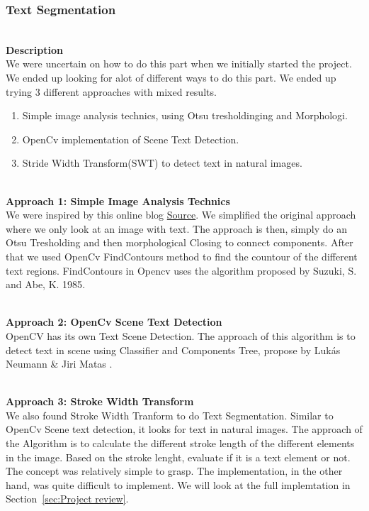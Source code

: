\documentclass[11pt,a4paper,UKenglish]{article}
\begin{document}
\subsubsection{Text Segmentation}
\noindent \\ \textbf{Description}
\noindent \\ We were uncertain on how to do this part when we initially started
the project. We ended up looking for alot of different ways to do this part.
We ended up trying 3 different approaches with mixed results.
\begin{enumerate}
  \item Simple image analysis technics, using Otsu tresholdinging and Morphologi.
  \item OpenCv implementation of Scene Text Detection.
  \item Stride Width Transform(SWT) to detect text in natural images.
\end{enumerate}

\noindent \\ \textbf{Approach 1: Simple Image Analysis Technics}
\noindent \\ We were inspired by this online blog \href{https://www.danvk.org/2015/01/07/finding-blocks-of-text-in-an-image-using-python-opencv-and-numpy.html}{Source}\cite{_finding_????}.
We simplified the original approach where we only look at an image with text.
The approach is then, simply do an Otsu Tresholding and then morphological
Closing to connect components. After that we used OpenCv FindContours method to
find the countour of the different text regions. FindContours in Opencv uses
the algorithm proposed by Suzuki, S. and Abe, K. 1985\cite{suzuki_topological_????}.

\noindent \\ \textbf{Approach 2: OpenCv Scene Text Detection}
\noindent \\ OpenCV has its own Text Scene Detection. The approach of this
algorithm is to detect text in scene using Classifier and Components Tree,
propose by Lukás Neumann \& Jiri Matas \cite{neumann_real-time_2012}.

\noindent \\ \textbf{Approach 3: Stroke Width Transform}
\noindent \\ We also found Stroke Width Tranform to do Text
Segmentation\cite{epshtein_stroke_2010}. Similar to OpenCv Scene text
detection, it looks for text in natural images. The approach of the Algorithm
is to calculate the different stroke length of the different elements in the
image. Based on the stroke lenght, evaluate if it is a text element or not.
The concept was relatively simple to grasp. The implementation, in the other
hand, was quite difficult to
implement. We will look at the full implemtation in Section~\ref{sec:Project review}.
\end{document}
